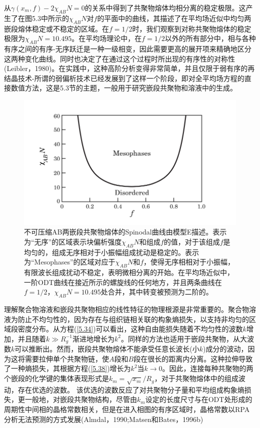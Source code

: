 从$\gamma(x_m,f)-2\chi_{AB}N=0$的关系中得到了共聚物熔体均相分离的稳定极限。这产生了在图5.3中所示的$\chi_{AB}N$对$f$的平面中的曲线，其描述了在平均场近似中均匀两嵌段熔体稳定或不稳定的区域。在$f=1/2$时，我们观察到对称共聚物熔体的稳定极限为$\chi_{AB}N=10.495$。在平均场理论中，在$f=1/2$以外的所有部分中，相与各种有序之间的有序-无序跃迁是一种一级相变，因此需要更高的展开项来精确地区分这两种变化曲线。同时也决定了在通过这个过程时所出现的有序性的对称性(Leibler，1980)。在实践中，这种高阶分析变得非常简单，并且仅限于弱有序的再结晶技术-所谓的弱偏析技术已经发展到了这样一个阶段，即对全平均场方程的直接数值方法，这是5.3节的主题，一般用于研究嵌段共聚物和溶液中的生成。
\begin{figure}[H]
      \centering
      \includegraphics[width=12cm]{./figures/4.png}
      \caption{不可压缩AB两嵌段共聚物熔体的Spinodal曲线由模型E描述。表示为“无序”的区域表示块偏析强度$\chi_{AB}N$和组成$f$的值，对于该组成$f$是均匀的，组成无序相对于小振幅组成扰动是稳定的。表示为“Mesophases”的区域对应于$\chi_{AB}N$和$f$，使得无序相相对于小振幅，有限波长组成扰动不稳定，表明微相分离的开始。在平均场近似中，一阶ODT曲线在接近所示的螺旋线的任何地方，并且两条曲线在$f=1/2$，$\chi_{AB}N=10.495$处合并，其中转变被预测为二阶的。}
\end{figure}
理解聚合物溶液和嵌段共聚物相应的线性特征的物理根源是非常重要的。聚合物溶液为防止不均匀性的，因为存在与组织链相关联的构象熵损失，以支持非均匀的区域段密度分布。从方程(\ref{5.34})可以看出，这种自由能损失随着不均匀性的波数$k$增加，并且随着$k\gg R_g^{-1}$渐进地增长为$k^2$。同样的方法也适用于嵌段共聚物，从大波数$k$可以推断出。然而，嵌段共聚物熔体不能承受任意长波长(小$k$)成分的波动，因为这将需要拉伸单个共聚物链，使$A$段和$B$段在很长的距离内分离。这种拉伸导致了一种熵损失，其根据方程(\ref{5.38})增长为$k^2$当$k\rightarrow 0$。因此，连接每种共聚物的两个嵌段的化学键的集体表现形式是$k_m=\sqrt{x_m}/R_g$，对于共聚物熔体中的组成波动，存在优选的波数。
该优选的波数反应了对共聚物分子量和平均组成构象熵损失，更一般地，对嵌段共聚物结构，尽管由$k_m$设定的长度尺寸与在ODT处形成的周期性中间相的晶格常数相关，但是在进入相图的有序区域时，晶格常数以RPA分析无法预测的方式发展(Almdal，1990;Matsen和Bates，1996b)

